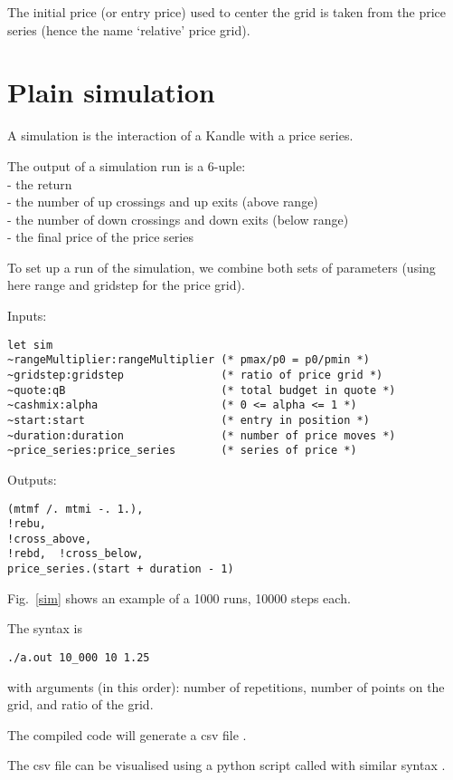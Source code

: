 \documentclass[oneside,12pt]{article}
\begin{document}
The initial price (or entry price) 
used to center the grid is taken from the price series (hence the name `relative' price grid).

\section{Plain simulation}
A simulation is the interaction of a Kandle with a price series.

The output of a simulation run is a 6-uple:
\\- the return
\\- the number of up crossings and up exits (above range)
\\- the number of down crossings and down exits (below range)
\\- the final price of the price series

To set up a run of the simulation, 
we combine both sets of parameters (using here range and gridstep for the price grid).

Inputs:
\begin{verbatim}
let sim 
~rangeMultiplier:rangeMultiplier (* pmax/p0 = p0/pmin *)
~gridstep:gridstep               (* ratio of price grid *)
~quote:qB                        (* total budget in quote *)
~cashmix:alpha                   (* 0 <= alpha <= 1 *)
~start:start                     (* entry in position *)
~duration:duration               (* number of price moves *)
~price_series:price_series       (* series of price *)
\end{verbatim}

Outputs:
\begin{verbatim}
(mtmf /. mtmi -. 1.), 
!rebu, 
!cross_above, 
!rebd,  !cross_below, 
price_series.(start + duration - 1)
\end{verbatim}

Fig.~\ref{sim} shows an example of a 1000 runs, 10000 steps each. 

The syntax is
\begin{verbatim}
./a.out 10_000 10 1.25
\end{verbatim}
with arguments (in this order): number of repetitions, number of points on the grid, and ratio of the grid. 

The compiled code will generate a csv file . 

The csv file can be visualised using a python script called  with similar syntax .
\end{document}
